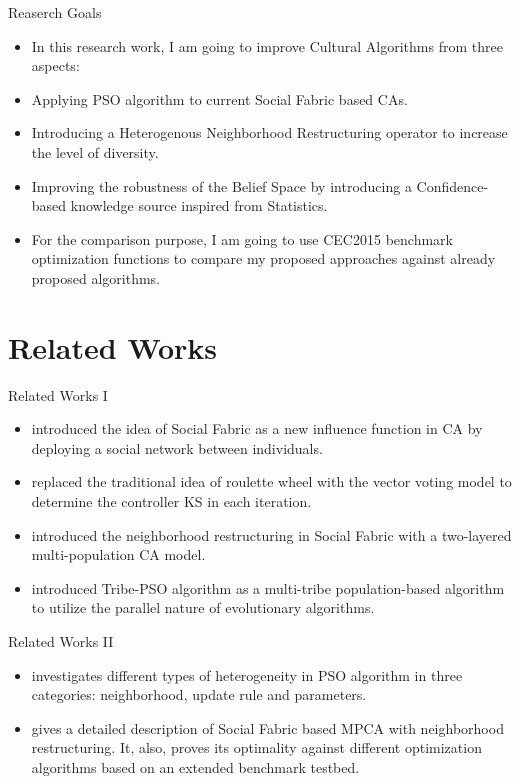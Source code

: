 \documentclass[table]{beamer}
\begin{document}
	\begin{frame}{Reaserch Goals}
		\begin{block}{}
			\begin{itemize}
				\justifying
				\item In this research work, I am going to improve Cultural Algorithms from three aspects:
				\item Applying PSO algorithm to current Social Fabric based CAs.
				\item Introducing a Heterogenous Neighborhood Restructuring operator to increase the level of diversity.
				\item Improving the robustness of the Belief Space by introducing a Confidence-based knowledge source inspired from Statistics.
				\item For the comparison purpose, I am going to use CEC2015 benchmark optimization functions to compare my proposed approaches against already proposed algorithms.
			\end{itemize}
		\end{block}
	\end{frame}
	
	\section{Related Works}
	
	\begin{frame}{Related Works I}
			\begin{itemize}
				\justifying
				\item \cite{R:1} introduced the idea of Social Fabric as a new influence function in CA by deploying a social network between individuals.
				\item \cite{che2010robust} replaced the traditional idea of roulette wheel with the vector voting model to determine the controller KS in each iteration.
				\item \cite{ali2012socio} introduced the neighborhood restructuring in Social Fabric with a two-layered multi-population CA model.
				\item \cite{chen2006tribe} introduced Tribe-PSO algorithm as a multi-tribe population-based algorithm to utilize the parallel nature of evolutionary algorithms.
			\end{itemize}
	\end{frame}
	
	\begin{frame}{Related Works II}
		\begin{itemize}
			\justifying
			\item \cite{de2009heterogeneous} investigates different types of heterogeneity in PSO algorithm in three categories: neighborhood, update rule and parameters.
			\item \cite{ali2016leveraged} gives a detailed description of Social Fabric based MPCA with neighborhood restructuring. It, also, proves its optimality against different optimization algorithms based on an extended benchmark testbed.
		\end{itemize}
	\end{frame}
	
\end{document}
